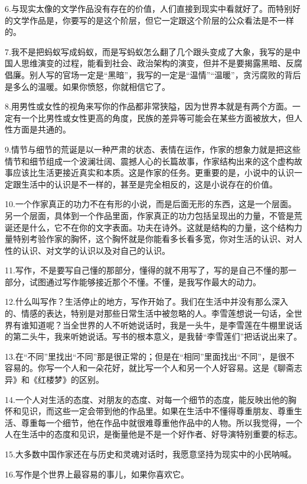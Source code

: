 \documentclass[12pt,a5paper]{ctexbook}
\begin{document}
6.与现实太像的文学作品没有存在的价值，人们直接到现实中看就好了。而特别好的文学作品是，你要写的是这个阶层，但它一定跟这个阶层的公众看法是不一样的。

7.我不是把蚂蚁写成蚂蚁，而是写蚂蚁怎么翻了几个跟头变成了大象，我写的是中国人思维演变的过程，能看到社会、政治架构的演变，但并不是要揭露黑暗、反腐倡廉。别人写的官场一定是“黑暗”，我写的一定是“温情”“温暖”，贪污腐败的背后是多么的温暖。如果你愤怒，你就相信它了。

8.用男性或女性的视角来写你的作品都非常狭隘，因为世界本就是有两个方面。一定有一个比男性或女性更高的角度，民族的差异等可能会在某些方面被放大，但人性方面是共通的。

9.情节与细节的荒诞是以一种严肃的状态、表情在运作，作家的想象力就是把这些情节和细节组成一个波澜壮阔、震撼人心的长篇故事，作家结构出来的这个虚构故事应该比生活更接近真实和本质。这是作家的任务。更重要的是，小说中的认识一定跟生活中的认识是不一样的，甚至是完全相反的，这是小说存在的价值。

10.一个作家真正的功力不在有形的小说，而是后面无形的东西，这是一个层面。另一个层面，具体到一个作品里面，作家真正的功力包括呈现出的力量，不管是荒诞还是什么，它不在你的文字表面。功夫在诗外。这就是结构的力量，这个结构力量特别考验作家的胸怀，这个胸怀就是你能看多长看多宽，你对生活的认识、对人性的认识、对文学的认识以及对自己的认识。

11.写作，不是要写自己懂的那部分，懂得的就不用写了，写的是自己不懂的那一部分，试图通过写作能够接近那个不懂。不懂，是我写作最大的动力。

12.什么叫写作？生活停止的地方，写作开始了。我们在生活中并没有那么深入的、情感的表达，特别是对那些日常生活中被忽略的人。李雪莲想说一句话，全世界有谁知道呢？当全世界的人不听她说话时，我是一头牛，是李雪莲在牛棚里说话的第二头牛，我来听她说话。写书的根本意义，是我替“李雪莲们”把话说出来了。

13.在“不同”里找出“不同”那是很正常的；但是在“相同”里面找出“不同”，是很不容易的。你写一个人和一朵花好，就比写一个人和另一个人好容易。这是《聊斋志异》和《红楼梦》的区别。

14.一个人对生活的态度、对朋友的态度、对每一个细节的态度，能反映出他的胸怀和见识，而这些一定会带到他的作品里。如果在生活中不懂得尊重朋友、尊重生活、尊重每一个细节，他在作品中就很难尊重他作品中的人物。所以我觉得，一个人在生活中的态度和见识，是衡量他是不是一个好作者、好导演特别重要的标志。

15.大多数中国作家还在与历史和灵魂对话时，我愿意坚持为现实中的小民呐喊。

16.写作是个世界上最容易的事儿，如果你喜欢它。
\end{document}
